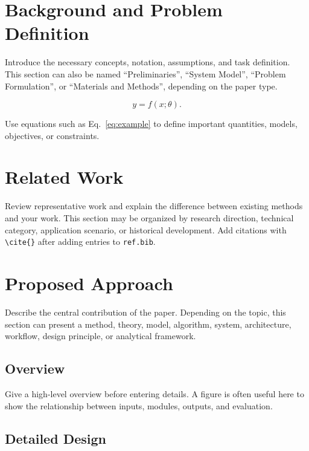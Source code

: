 \documentclass[letterpaper,10pt,journal,twoside]{IEEEtran}
\begin{document}
\section{Background and Problem Definition}
\label{sec:background}

Introduce the necessary concepts, notation, assumptions, and task definition.
This section can also be named ``Preliminaries'', ``System Model'',
``Problem Formulation'', or ``Materials and Methods'', depending on the paper
type.

\begin{equation}
    y = f(x;\theta).
    \label{eq:example}
\end{equation}

Use equations such as Eq.~\eqref{eq:example} to define important quantities,
models, objectives, or constraints.

\section{Related Work}
\label{sec:related}

Review representative work and explain the difference between existing methods
and your work. This section may be organized by research direction, technical
category, application scenario, or historical development. Add citations with
\verb|\cite{}| after adding entries to \verb|ref.bib|.

\section{Proposed Approach}
\label{sec:approach}

Describe the central contribution of the paper. Depending on the topic, this
section can present a method, theory, model, algorithm, system, architecture,
workflow, design principle, or analytical framework.

\subsection{Overview}
\label{subsec:framework}

Give a high-level overview before entering details. A figure is often useful
here to show the relationship between inputs, modules, outputs, and evaluation.

\subsection{Detailed Design}
\label{subsec:design}
\end{document}
